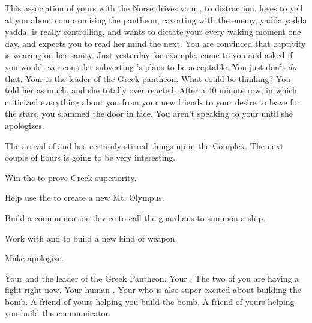 \documentclass[char]{guardians}
\begin{document}
This association of yours with the Norse drives your \cHera{\parent}, \cHera{} to distraction. \cHera{\They} loves to yell at you about compromising the pantheon, cavorting with the enemy, yadda yadda yadda. \cHera{\They} is really controlling, and wants to dictate your every waking moment one day, and expects you to read her mind the next. You are convinced that captivity is wearing on her sanity. Just yesterday for example, \cHera{} came to you and asked if you would ever consider subverting \cZeus{}'s plans to be acceptable. You just don't \emph{do} that. Your \cZeus{\parent} is the leader of the Greek pantheon. What could \cHera{} be thinking? You told her as much, and she totally over reacted.  After a 40 minute row, in which \cHera{} criticized everything about you from your new friends to your desire to leave for the stars, you slammed the door in \cHera{\them} face. You aren't speaking to your \cHera{\parent} until she apologizes.

The arrival of \cUnity{} and \cKachiko{} has certainly stirred things up in the Complex. The next couple of hours is going to be very interesting.


\begin{itemz}[Goals]
  \item Win the \pGames{} to prove Greek superiority.
  \item Help \cZeus{} use the \stone{} to create a new Mt. Olympus.
  \item Build a communication device to call the guardians to summon a ship.
  \item Work with \cHephaestus{} and \cVal{} to build a new kind of weapon.
  \item Make \cHera{} apologize.
\end{itemz}


\begin{contacts}
  \contact{\cZeus{}} Your \cZeus{\parent} and the leader of the Greek Pantheon.
  \contact{\cHera{}} Your \cHera{\parent}. The two of you are having a fight right now.
  \contact{\cPandora{}} Your human \cPandora{\sibling}.
  \contact{\cHephaestus{}} Your \cHephaestus{\sibling} who is also super excited about building the bomb.
  \contact{\cVal{}} A friend of yours helping you build the bomb.
  \contact{\cFenrir{}} A friend of yours helping you build the communicator.
\end{contacts}
\end{document}
